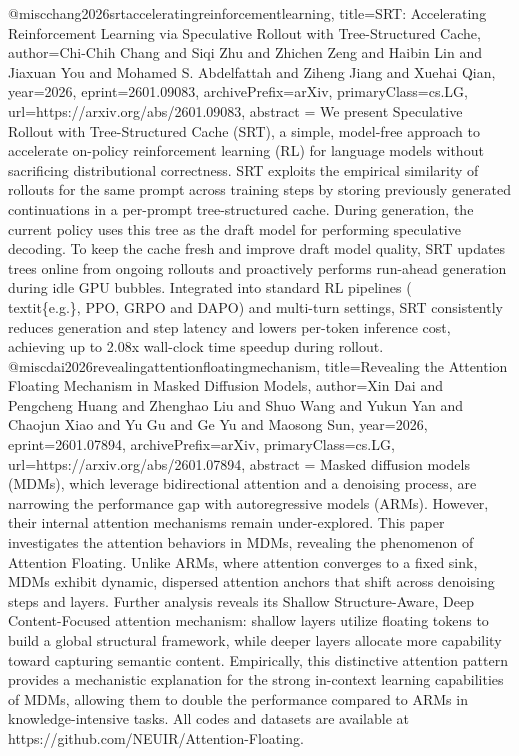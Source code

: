 {}@misc{chang2026srtacceleratingreinforcementlearning,
      title={SRT: Accelerating Reinforcement Learning via Speculative Rollout with Tree-Structured Cache}, 
      author={Chi-Chih Chang and Siqi Zhu and Zhichen Zeng and Haibin Lin and Jiaxuan You and Mohamed S. Abdelfattah and Ziheng Jiang and Xuehai Qian},
      year={2026},
      eprint={2601.09083},
      archivePrefix={arXiv},
      primaryClass={cs.LG},
      url={https://arxiv.org/abs/2601.09083},
      abstract = {We present Speculative Rollout with Tree-Structured Cache (SRT), a simple, model-free approach to accelerate on-policy reinforcement learning (RL) for language models without sacrificing distributional correctness. SRT exploits the empirical similarity of rollouts for the same prompt across training steps by storing previously generated continuations in a per-prompt tree-structured cache. During generation, the current policy uses this tree as the draft model for performing speculative decoding. To keep the cache fresh and improve draft model quality, SRT updates trees online from ongoing rollouts and proactively performs run-ahead generation during idle GPU bubbles. Integrated into standard RL pipelines (\\textit\{e.g.\}, PPO, GRPO and DAPO) and multi-turn settings, SRT consistently reduces generation and step latency and lowers per-token inference cost, achieving up to 2.08x wall-clock time speedup during rollout.}
}@misc{dai2026revealingattentionfloatingmechanism,
      title={Revealing the Attention Floating Mechanism in Masked Diffusion Models}, 
      author={Xin Dai and Pengcheng Huang and Zhenghao Liu and Shuo Wang and Yukun Yan and Chaojun Xiao and Yu Gu and Ge Yu and Maosong Sun},
      year={2026},
      eprint={2601.07894},
      archivePrefix={arXiv},
      primaryClass={cs.LG},
      url={https://arxiv.org/abs/2601.07894},
      abstract = {Masked diffusion models (MDMs), which leverage bidirectional attention and a denoising process, are narrowing the performance gap with autoregressive models (ARMs). However, their internal attention mechanisms remain under-explored. This paper investigates the attention behaviors in MDMs, revealing the phenomenon of Attention Floating. Unlike ARMs, where attention converges to a fixed sink, MDMs exhibit dynamic, dispersed attention anchors that shift across denoising steps and layers. Further analysis reveals its Shallow Structure-Aware, Deep Content-Focused attention mechanism: shallow layers utilize floating tokens to build a global structural framework, while deeper layers allocate more capability toward capturing semantic content. Empirically, this distinctive attention pattern provides a mechanistic explanation for the strong in-context learning capabilities of MDMs, allowing them to double the performance compared to ARMs in knowledge-intensive tasks. All codes and datasets are available at https://github.com/NEUIR/Attention-Floating.}
}
